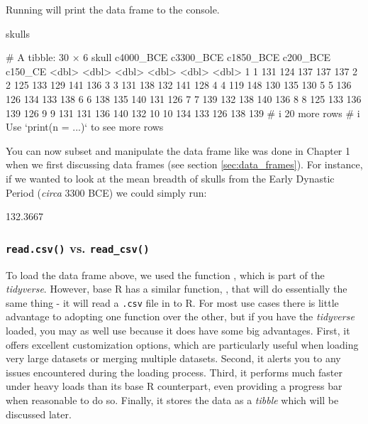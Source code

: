 Running  will print the data frame to the console.

\begin{inR}
skulls
\end{inR}

\begin{outR}
# A tibble: 30 × 6
   skull c4000_BCE c3300_BCE c1850_BCE c200_BCE c150_CE
   <dbl>     <dbl>     <dbl>     <dbl>    <dbl>   <dbl>
 1     1       131       124       137      137     137
 2     2       125       133       129      141     136
 3     3       131       138       132      141     128
 4     4       119       148       130      135     130
 5     5       136       126       134      133     138
 6     6       138       135       140      131     126
 7     7       139       132       138      140     136
 8     8       125       133       136      139     126
 9     9       131       131       136      140     132
10    10       134       133       126      138     139
# i 20 more rows
# i Use `print(n = ...)` to see more rows
\end{outR}

You can now subset and manipulate the data frame  like was done in Chapter 1 when we first discussing data frames (see section \ref{sec:data_frames}). For instance, if we wanted to look at the mean breadth of skulls from the Early Dynastic Period (\textit{circa} 3300 BCE) we could simply run:

\begin{outR}
[1] 132.3667
\end{outR}

\subsubsection{\texttt{read.csv()} vs. \texttt{read\_csv()}}

To load the  data frame above, we used the function , which is part of the \textit{tidyverse}. However, base R has a similar function, , that will do essentially the same thing - it will read a \texttt{.csv} file in to R. For most use cases there is little advantage to adopting one function over the other, but if you have the \textit{tidyverse} loaded, you may as well use  because it does have some big advantages. First, it offers excellent customization options, which are particularly useful when loading very large datasets or merging multiple datasets. Second, it alerts you to any issues encountered during the loading process. Third, it performs much faster under heavy loads than its base R counterpart, even providing a progress bar when reasonable to do so. Finally, it stores the data as a \textit{tibble} which will be discussed later.

